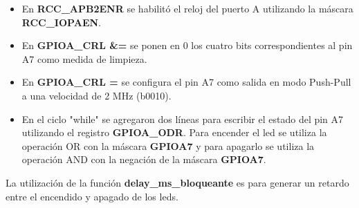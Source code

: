 \begin{itemize}
    \item En \textbf{RCC\_APB2ENR} se habilitó el reloj del puerto A utilizando la máscara \textbf{RCC\_IOPAEN}.
    \item En \textbf{GPIOA\_CRL \&=} se ponen en 0 los cuatro bits correspondientes al pin A7 como medida de limpieza.
    \item En \textbf{GPIOA\_CRL \textbar=} se configura el pin A7 como salida en modo Push-Pull a una velocidad de 2 MHz (b0010).
    \item En el ciclo "while" se agregaron dos líneas para escribir el estado del pin A7 utilizando el registro \textbf{GPIOA\_ODR}. Para encender el led se utiliza la operación OR con la máscara \textbf{GPIOA7} y para apagarlo se utiliza la operación AND con la negación de la máscara \textbf{GPIOA7}.
\end{itemize}
    La utilización de la función \textbf{delay\_ms\_bloqueante} es para generar un retardo entre el encendido y apagado de los leds.